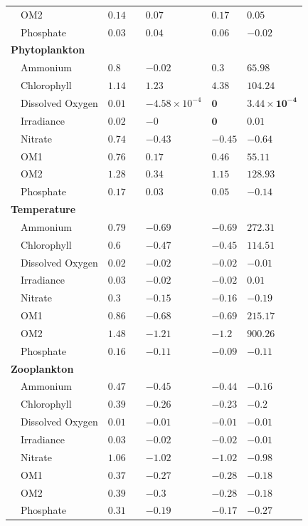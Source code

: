 \documentclass[letterpaper,12pt,oneside]{article}\usepackage[]{graphicx}\usepackage[]{color}
\begin{document}
\begin{table}[!tbp]
{\begin{center}
\begin{tabular}{llclll}
~~OM2&$0.14$&&$\bm{0.07}$&$\bm{0.17}$&$\bm{0.05}$\tabularnewline
~~Phosphate&$0.03$&&$\bm{0.04}$&$\bm{0.06}$&$-0.02$\tabularnewline
\hline
{\bfseries Phytoplankton}&&&&&\tabularnewline
~~Ammonium&$0.8$&&$-0.02$&$\bm{0.3}$&$\bm{65.98}$\tabularnewline
~~Chlorophyll&$1.14$&&$\bm{1.23}$&$\bm{4.38}$&$\bm{104.24}$\tabularnewline
~~Dissolved Oxygen&$0.01$&&$-4.58\times 10^{-4}$&$\bm{0}$&$\bm{3.44\times 10^{-4}}$\tabularnewline
~~Irradiance&$0.02$&&$-0$&$\bm{0}$&$\bm{0.01}$\tabularnewline
~~Nitrate&$0.74$&&$-0.43$&$-0.45$&$-0.64$\tabularnewline
~~OM1&$0.76$&&$\bm{0.17}$&$\bm{0.46}$&$\bm{55.11}$\tabularnewline
~~OM2&$1.28$&&$\bm{0.34}$&$\bm{1.15}$&$\bm{128.93}$\tabularnewline
~~Phosphate&$0.17$&&$\bm{0.03}$&$\bm{0.05}$&$-0.14$\tabularnewline
\hline
{\bfseries Temperature}&&&&&\tabularnewline
~~Ammonium&$0.79$&&$-0.69$&$-0.69$&$\bm{272.31}$\tabularnewline
~~Chlorophyll&$0.6$&&$-0.47$&$-0.45$&$\bm{114.51}$\tabularnewline
~~Dissolved Oxygen&$0.02$&&$-0.02$&$-0.02$&$-0.01$\tabularnewline
~~Irradiance&$0.03$&&$-0.02$&$-0.02$&$\bm{0.01}$\tabularnewline
~~Nitrate&$0.3$&&$-0.15$&$-0.16$&$-0.19$\tabularnewline
~~OM1&$0.86$&&$-0.68$&$-0.69$&$\bm{215.17}$\tabularnewline
~~OM2&$1.48$&&$-1.21$&$-1.2$&$\bm{900.26}$\tabularnewline
~~Phosphate&$0.16$&&$-0.11$&$-0.09$&$-0.11$\tabularnewline
\hline
{\bfseries Zooplankton}&&&&&\tabularnewline
~~Ammonium&$0.47$&&$-0.45$&$-0.44$&$-0.16$\tabularnewline
~~Chlorophyll&$0.39$&&$-0.26$&$-0.23$&$-0.2$\tabularnewline
~~Dissolved Oxygen&$0.01$&&$-0.01$&$-0.01$&$-0.01$\tabularnewline
~~Irradiance&$0.03$&&$-0.02$&$-0.02$&$-0.01$\tabularnewline
~~Nitrate&$1.06$&&$-1.02$&$-1.02$&$-0.98$\tabularnewline
~~OM1&$0.37$&&$-0.27$&$-0.28$&$-0.18$\tabularnewline
~~OM2&$0.39$&&$-0.3$&$-0.28$&$-0.18$\tabularnewline
~~Phosphate&$0.31$&&$-0.19$&$-0.17$&$-0.27$\tabularnewline
\hline
\end{tabular}\end{center}}

\end{table}


\clearpage

\end{document}
